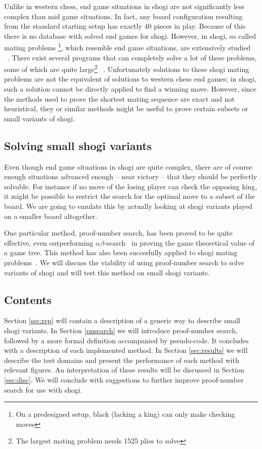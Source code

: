 \documentclass{article}
\begin{document}
Unlike in western chess, end game situations
in shogi are not significantly less complex than mid game situations. In fact, any board configuration resulting from the standard
starting setup has exactly 40 pieces in play. Because of this there is no database with solved end games for shogi.
However, in shogi, so called mating problems \footnote{On a predesigned setup, black (lacking a king) can only make checking moves},
which resemble end game situations, are extensively studied ~\cite{grimbergen1999survey}. There exist several
programs that can completely solve a lot of these problems, some of which are quite large\footnote{The largest mating problem needs 1525 plies to solve}
~\cite{seo2001pn}. Unfortunately solutions to these shogi
mating problems are not the equivalent of solutions to western chess end games; in shogi, such a solution cannot be directly applied to find a winning move.
However, since the methods used to prove the shortest mating sequence are exact and not heuristical, they or similar methods might be useful to prove
certain subsets or small variants of shogi.\\

\subsection{Solving small shogi variants}
Even though end game situations in shogi are quite complex, there are of course enough situations advanced enough -- near victory -- that they
should be perfectly solvable. For instance if no move of the losing player can check the opposing king, it might be possible to restrict the search
for the optimal move to a subset of the board. We are going to emulate this by actually looking at shogi variants played on a smaller board
altogether.

One particular method, proof-number search, has been proved to be quite effective, even outperforming $\alpha\beta$-search~\cite{van2008proof} in
proving the game theoretical value of a game tree. This method has also been succesfully applied to shogi mating
problems~\cite{seo2001pn, ueda2008weak, sakuta2001performance}. We will discuss the viability of using proof-number search to solve variants of shogi and will test
this method on small shogi variants.

\subsection{Contents}
Section \ref{sec:rep} will contain a description of a generic way to describe small shogi variants. In Section \ref{pnsearch} we will introduce proof-number
search, followed by a more formal definition accompanied by pseudo-code. It concludes with a description of each implemented method.
In Section \ref{sec:results} we will describe the test domains and present the performance of each method with relevant figures.
An interpretation of these results will be discussed in Section \ref{sec:disc}. We will conclude with suggestions to further improve
proof-number search for use with shogi.
\end{document}

